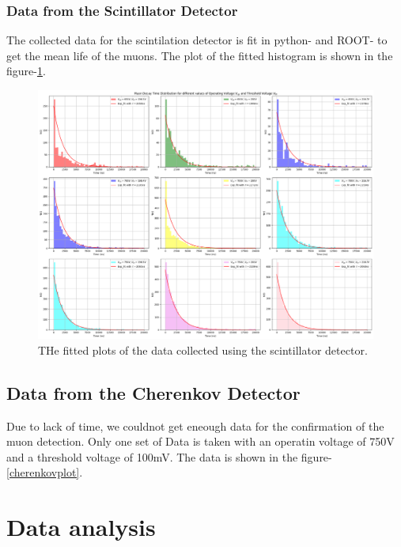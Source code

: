 \documentclass{article}
\begin{document}
\begin{multicols}{2}
\subsubsection{Data from the Scintillator Detector}
The collected data for the scintilation detector is fit in python-\cite{python} and ROOT-\cite{ROOT} to get the mean life of the muons. The plot of the fitted histogram is shown in the figure-\ref{scintplots}.
\begin{figure}
    \centering
    \includegraphics[width = 2\columnwidth]{Images/scint_plots.png}
    \caption{THe fitted plots of the data collected using the scintillator detector.}
    \label{scintplots}
\end{figure}

\subsection{Data from the Cherenkov Detector}

Due to lack of time, we couldnot get eneough data for the confirmation of the muon detection. Only one set of Data is taken with an operatin voltage of 750V and a threshold voltage of 100mV. The data is shown in the figure-\ref{cherenkovplot}.




\section{\label{dataanalysis}Data analysis}





\end{multicols}
\end{document}

